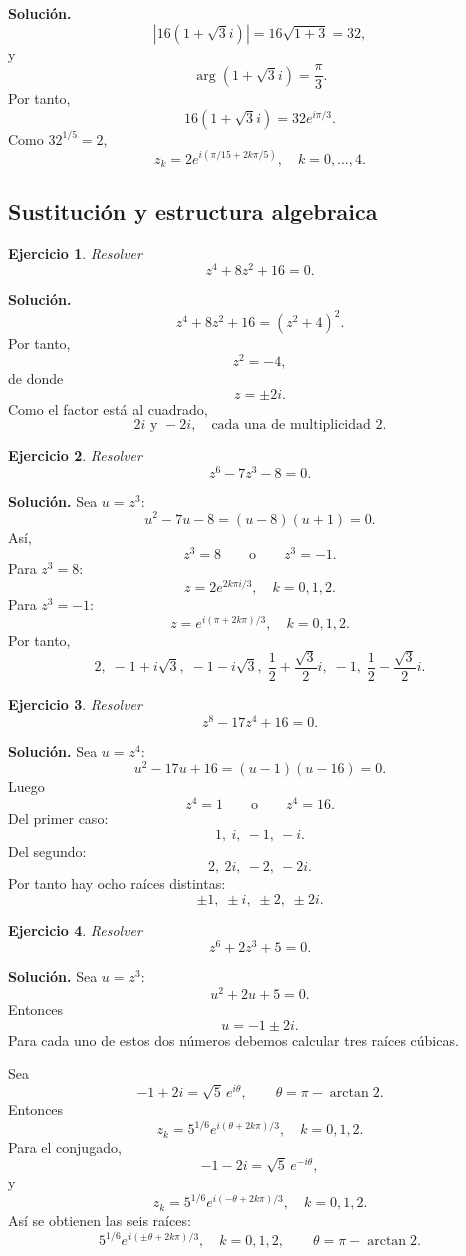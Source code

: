 \documentclass[12pt]{article}
\newtheorem{ejercicio}{Ejercicio}[section]
\begin{document}
\textbf{Solución.}
\[
|16(1+\sqrt3 i)|=16\sqrt{1+3}=32,
\]
y
\[
\arg(1+\sqrt3 i)=\frac{\pi}{3}.
\]
Por tanto,
\[
16(1+\sqrt3 i)=32e^{i\pi/3}.
\]
Como $32^{1/5}=2$,
\[
\boxed{
z_k=2e^{i(\pi/15+2k\pi/5)},\quad k=0,\ldots,4.
}
\]
\subsection*{Sustitución y estructura algebraica}
\begin{ejercicio}
Resolver
\[
z^4+8z^2+16=0.
\]
\end{ejercicio}

\textbf{Solución.}
\[
z^4+8z^2+16=(z^2+4)^2.
\]
Por tanto,
\[
z^2=-4,
\]
de donde
\[
z=\pm2i.
\]
Como el factor está al cuadrado,
\[
\boxed{2i\text{ y }-2i,\quad\text{cada una de multiplicidad }2.}
\]

\begin{ejercicio}
Resolver
\[
z^6-7z^3-8=0.
\]
\end{ejercicio}

\textbf{Solución.}
Sea $u=z^3$:
\[
u^2-7u-8=(u-8)(u+1)=0.
\]
Así,
\[
z^3=8\qquad\text{o}\qquad z^3=-1.
\]
Para $z^3=8$:
\[
z=2e^{2k\pi i/3},\quad k=0,1,2.
\]
Para $z^3=-1$:
\[
z=e^{i(\pi+2k\pi)/3},\quad k=0,1,2.
\]
Por tanto,
\[
\boxed{
2,\;-1+i\sqrt3,\;-1-i\sqrt3,\;
\frac12+\frac{\sqrt3}{2}i,\;-1,\;
\frac12-\frac{\sqrt3}{2}i.
}
\]

\begin{ejercicio}
Resolver
\[
z^8-17z^4+16=0.
\]
\end{ejercicio}

\textbf{Solución.}
Sea $u=z^4$:
\[
u^2-17u+16=(u-1)(u-16)=0.
\]
Luego
\[
z^4=1\qquad\text{o}\qquad z^4=16.
\]
Del primer caso:
\[
1,\ i,\ -1,\ -i.
\]
Del segundo:
\[
2,\ 2i,\ -2,\ -2i.
\]
Por tanto hay ocho raíces distintas:
\[
\boxed{\pm1,\;\pm i,\;\pm2,\;\pm2i.}
\]

\begin{ejercicio}
Resolver
\[
z^6+2z^3+5=0.
\]
\end{ejercicio}

\textbf{Solución.}
Sea $u=z^3$:
\[
u^2+2u+5=0.
\]
Entonces
\[
u=-1\pm2i.
\]
Para cada uno de estos dos números debemos calcular tres raíces cúbicas.

Sea
\[
-1+2i=\sqrt5\,e^{i\theta},
\qquad
\theta=\pi-\arctan 2.
\]
Entonces
\[
z_k=5^{1/6}e^{i(\theta+2k\pi)/3},
\quad k=0,1,2.
\]
Para el conjugado,
\[
-1-2i=\sqrt5\,e^{-i\theta},
\]
y
\[
z_k=5^{1/6}e^{i(-\theta+2k\pi)/3},
\quad k=0,1,2.
\]
Así se obtienen las seis raíces:
\[
\boxed{
5^{1/6}e^{i(\pm\theta+2k\pi)/3},
\quad k=0,1,2,\qquad
\theta=\pi-\arctan2.
}
\]
\end{document}
